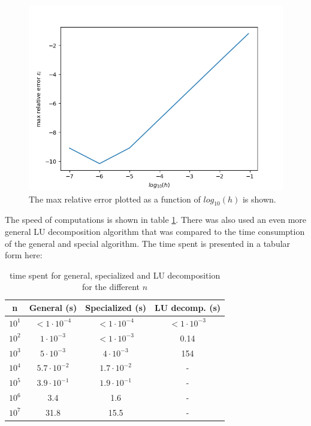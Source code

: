 \documentclass[english,a4paper, 11pt]{article}
\begin{document}
\begin{figure}[H]
\centering
\includegraphics[scale=0.5]{max_rel_error.png}
\caption{The max relative error plotted as a function of $log_{10}(h)$ is shown.}\label{fig4}
\end{figure}

The speed of computations is shown in table \ref{speed}. There was also used an even more general LU decomposition algorithm that was compared to the time consumption of the general and special algorithm. The time spent is presented in a tabular form here:

\begin{table}[H]
\caption{time spent for general, specialized and LU decomposition for the different $n$}\label{speed}\center
\begin{tabular}{|c|c|c|c|}

\hline
n & General (s) & Specialized (s) & LU decomp. (s) \\
\hline
$10^1$ & $<1\cdot10^{-4}$ & $<1\cdot10^{-4}$ & $<1\cdot10^{-3}$ \\
\hline
$10^2$ & $1\cdot10^{-3}$ & $<1\cdot10^{-3}$ & 0.14 \\
\hline
$10^3$ & $5\cdot10^{-3}$ & $4\cdot10^{-3}$ & 154 \\
\hline
$10^4$ & $5.7\cdot10^{-2}$ & $1.7\cdot10^{-2}$ & -\\
\hline
$10^5$ & $3.9\cdot10^{-1}$ & $1.9\cdot10^{-1}$ & - \\
\hline
$10^6$ & 3.4 & 1.6 & -\\
\hline
$10^7$ & 31.8 & 15.5 & -\\
\hline
\end{tabular}
\end{table}
\end{document}
